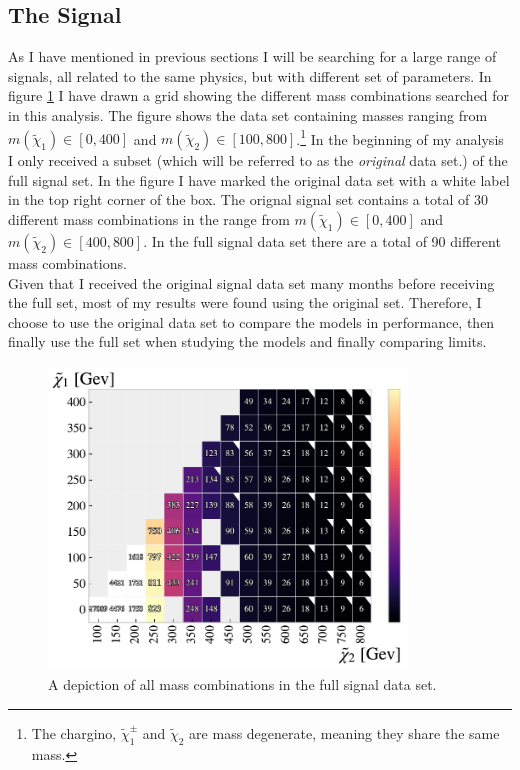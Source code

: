 \subsection{The Signal}\label{subsec:signal}
As I have mentioned in previous sections I will be searching for a large range of signals, all related to the same
physics, but with different set of parameters. In figure \ref{fig:nrSignal} I have drawn a grid showing the different mass combinations 
searched for in this analysis. The figure shows the data set containing masses ranging from $m({\tilde{\chi}_1})\in[0,400]$
and $m({\tilde{\chi}_2})\in[100,800]$.\footnote{The chargino, $\tilde{\chi}^{\pm}_1$ and $\tilde{\chi}_2$ are mass degenerate, 
meaning they share the same mass.} In the beginning of my analysis I only received a subset (which will be referred to as the 
\emph{original} data set.) of the full signal set. In the figure I have marked the original data set with a white label in the top 
right corner of the box. The orignal signal set contains a total of 30 different mass combinations in the range from 
$m({\tilde{\chi}_1})\in[0,400]$ and $m({\tilde{\chi}_2})\in[400,800]$. In the full signal data set there are a total of 90 different 
mass combinations.
\\
Given that I received the original signal data set many months before receiving the full set, most of my results were found using the 
original set. Therefore, I choose to use the original data set to compare the models in performance, then finally use the full set 
when studying the models and finally comparing limits.
\begin{figure}
  \centering
  \includegraphics[width=0.85\textwidth]{Figures/MLResults/NN/SUSY/Grid/NrSignalEvents.pdf}
  \caption{A depiction of all mass combinations in the full signal data set.}
  \label{fig:nrSignal}
\end{figure}
